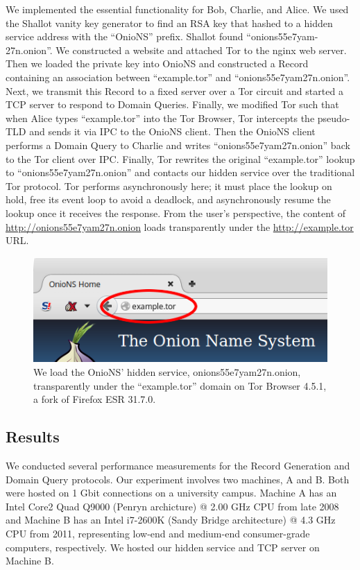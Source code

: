 \documentclass{sig-alternate}
\begin{document}
We implemented the essential functionality for Bob, Charlie, and Alice. We used the Shallot\cite{KatmagicShallot} vanity key generator to find an RSA key that hashed to a hidden service address with the ``OnioNS'' prefix. Shallot found ``onions55e7yam-27n.onion''. We constructed a website and attached Tor to the nginx web server. Then we loaded the private key into OnioNS and constructed a Record containing an association between ``example.tor'' and ``onions55e7yam27n.onion''. Next, we transmit this Record to a fixed server over a Tor circuit and started a TCP server to respond to Domain Queries. Finally, we modified Tor such that when Alice types ``example.tor'' into the Tor Browser, Tor intercepts the pseudo-TLD and sends it via IPC to the OnioNS client. Then the OnioNS client performs a Domain Query to Charlie and writes ``onions55e7yam27n.onion'' back to the Tor client over IPC. Finally, Tor rewrites the original ``example.tor'' lookup to ``onions55e7yam27n.onion'' and contacts our hidden service over the traditional Tor protocol. Tor performs asynchronously here; it must place the lookup on hold, free its event loop to avoid a deadlock, and asynchronously resume the lookup once it receives the response. From the user's perspective, the content of \url{http://onions55e7yam27n.onion} loads transparently under the \url{http://example.tor} URL.

\begin{figure}[h]
	\centering
	\includegraphics[width=\linewidth]{../images/example.png}
	\caption{We load the OnioNS' hidden service, onions55e7yam27n.onion, transparently under the ``example.tor'' domain on Tor Browser 4.5.1, a fork of Firefox ESR 31.7.0.}
	\label{fig:cumulativeProbability}
\end{figure}

\subsection{Results}

We conducted several performance measurements for the Record Generation and Domain Query protocols. Our experiment involves two machines, A and B. Both were hosted on 1 Gbit connections on a university campus. Machine A has an Intel Core2 Quad Q9000 (Penryn archicture) @ 2.00 GHz CPU from late 2008 and Machine B has an Intel i7-2600K (Sandy Bridge architecture) @ 4.3 GHz CPU from 2011, representing low-end and medium-end consumer-grade computers, respectively. We hosted our hidden service and TCP server on Machine B.
\end{document}

